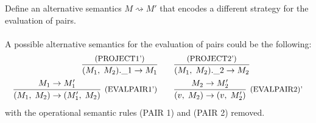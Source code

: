 \subsection{}

Define an alternative semantics $M \rightsquigarrow M'$ that encodes a
different strategy for the evaluation of pairs.\\~\\ A possible
alternative semantics for the evaluation of pairs could be the
following:
\begin{align*}
  \infer{\FST{\PAIR{M_1}{M_2}} \to M_1}{\text{\small{(PROJECT1')}}} &
  \qquad \infer{\SND{\PAIR{M_1}{M_2}} \to
    M_2}{\text{\small{(PROJECT2')}}}
  \\ \infer[\text{\small{(EVALPAIR1')}}]{\PAIR{M_1}{M_2} \to
    \PAIR{M_1'}{M_2}}{M_1 \to M_1'} & \qquad
  \infer[\text{\small{(EVALPAIR2)}'}]{\PAIR{v}{M_2} \to
    \PAIR{v}{M_2'}}{M_2 \to M_2'}
\end{align*}
with the operational semantic rules (PAIR 1) and (PAIR 2) removed.
